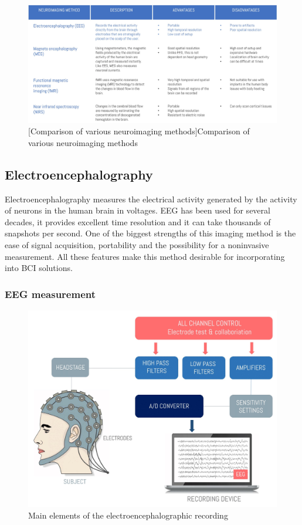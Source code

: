 \documentclass[letterpaper,10pt]{article}
\let\oldsubsection\subsection
\renewcommand{\subsection}{\def\cursectioning{subsection}\oldsubsection}
\begin{document}
\begin{figure}[h]
\centering
\includegraphics[scale=0.3]{fmri1.jpg}
[Comparison of various neuroimaging methods]{Comparison of various neuroimaging methods \cite{bci_fs}}
\label{img:imaging_dev}
\end{figure}

\subsection{Electroencephalography}

Electroencephalography measures the electrical activity generated by the activity of neurons in the human brain in voltages. EEG has been used for several decades, it provides excellent time resolution and it can take thousands of snapshots per second. One of the biggest strengths of this imaging method is the ease of signal acquisition, portability and the possibility for a noninvasive measurement. All these features make this method desirable for incorporating into BCI solutions. \cite{imotions_2017}

\subsubsection{EEG measurement}

\begin{figure}[h]
\centering
\includegraphics[scale=0.25]{eegabra.jpg}
\caption{Main elements of the electroencephalographic recording}
\label{fig:inside}
\end{figure}
\end{document}

